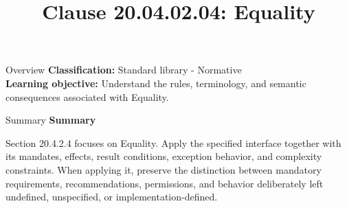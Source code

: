 \documentclass[10pt,letterpaper]{article}
\title{Clause 20.04.02.04: Equality}
\author{}
\date{}
\begin{document}
\maketitle
\begin{CornellOverviewBox}{Overview}
\textbf{Classification:} Standard library - Normative\\[2pt]
\textbf{Learning objective:} Understand the rules, terminology, and semantic consequences associated with Equality.
\end{CornellOverviewBox}\begin{CornellSummaryBox}{Summary}
{\sffamily\bfseries\color{Accent} Summary}\par\vspace{3pt}Section 20.4.2.4 focuses on Equality. Apply the specified interface together with its mandates, effects, result conditions, exception behavior, and complexity constraints. When applying it, preserve the distinction between mandatory requirements, recommendations, permissions, and behavior deliberately left undefined, unspecified, or implementation-defined.
\end{CornellSummaryBox}
\end{document}
